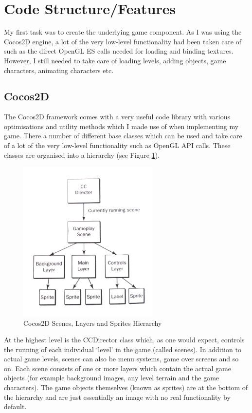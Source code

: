 \documentclass[a4paper,oneside]{report}
\begin{document}
\section{Code Structure/Features}

My first task was to create the underlying game component. As I was using the Cocos2D engine, a lot of the very low-level functionality had been taken care of such as the direct OpenGL ES calls needed for loading and binding textures. However, I still needed to take care of loading levels, adding objects, game characters, animating characters etc.

\subsection{Cocos2D} 

The Cocos2D framework comes with a very useful code library with various optimisations and utility methods which I made use of when implementing my game. There a number of different base classes which can be used and take care of a lot of the very low-level functionality such as OpenGL API calls. These classes are organised into a hierarchy (see Figure \ref{fig:Hierarchy}). 

\begin{figure}
  \centering
    \includegraphics[width=70mm]{sources/images/Cocos2DHierarchy}
    \caption{Cocos2D Scenes, Layers and Sprites Hierarchy \cite{Strougo:2011ys}}
    \label{fig:Hierarchy}
\end{figure}

At the highest level is the CCDirector class which, as one would expect, controls the running of each individual `level' in the game (called scenes). In addition to actual game levels, scenes can also be menu systems, game over screens and so on. Each scene consists of one or more layers which contain the actual game objects (for example background images, any level terrain and the game characters). The game objects themselves (known as sprites) are at the bottom of the hierarchy and are just essentially an image with no real functionality by default. 
\end{document}
